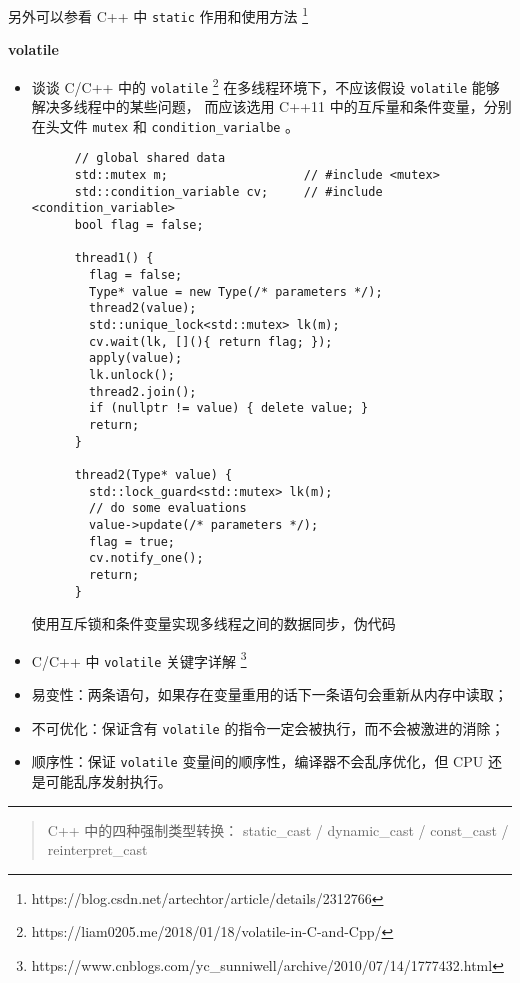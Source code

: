 另外可以参看 C++ 中 \verb|static| 作用和使用方法%
\footnote{https://blog.csdn.net/artechtor/article/details/2312766}%


\noindent\textbf{volatile}

\begin{itemize}
\item 谈谈 C/C++ 中的 \verb|volatile| %
  \footnote{https://liam0205.me/2018/01/18/volatile-in-C-and-Cpp/}%
  \quad 在多线程环境下，不应该假设 \verb|volatile| 能够解决多线程中的某些问题，
  而应该选用 C++11 中的互斥量和条件变量，分别在头文件 \verb|mutex| 和
  \verb|condition_varialbe| 。

  \begin{sourcecode}[hbtp]
    \begin{Verbatim}
      // global shared data
      std::mutex m;                   // #include <mutex>
      std::condition_variable cv;     // #include <condition_variable>
      bool flag = false;
      
      thread1() {
        flag = false;
        Type* value = new Type(/* parameters */);
        thread2(value);
        std::unique_lock<std::mutex> lk(m);
        cv.wait(lk, [](){ return flag; });
        apply(value);
        lk.unlock();
        thread2.join();
        if (nullptr != value) { delete value; }
        return;
      }
      
      thread2(Type* value) {
        std::lock_guard<std::mutex> lk(m);
        // do some evaluations
        value->update(/* parameters */);
        flag = true;
        cv.notify_one();
        return;
      }
    \end{Verbatim}
    \caption{使用互斥锁和条件变量实现多线程之间的数据同步，伪代码}
  \end{sourcecode}
  
\item C/C++ 中 \verb|volatile| 关键字详解 %
  \footnote{https://www.cnblogs.com/yc\_sunniwell/archive/2010/07/14/1777432.html}%
\item 易变性：两条语句，如果存在变量重用的话下一条语句会重新从内存中读取；
\item 不可优化：保证含有 \verb|volatile| 的指令一定会被执行，而不会被激进的消除；
\item 顺序性：保证 \verb|volatile| 变量间的顺序性，编译器不会乱序优化，但 CPU 还
  是可能乱序发射执行。
\end{itemize}


\noindent\rule[0.25\baselineskip]{\textwidth}{1pt}

\begin{quotation}
  {\color{red}C++ 中的四种强制类型转换： static\_cast / dynamic\_cast / const\_cast / reinterpret\_cast }
\end{quotation}

